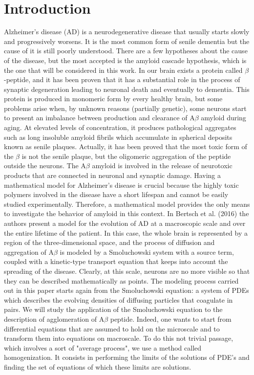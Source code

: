 \section{Introduction}
Alzheimer's disease (AD) is a neurodegenerative disease that usually starts slowly and progressively worsens. It is the most common form of senile dementia but the cause of it is still poorly understood. 
There are a few hypotheses about the cause of the disease, but the most accepted is the amyloid cascade hypothesis, which is the one that will be considered in this work.
In our brain exists a protein called \(\beta\)-peptide, and it has been proven that it has a substantial role in the process of synaptic degeneration leading to neuronal death and eventually to dementia. This protein is produced in monomeric form by every healthy brain, but some problems arise when,  by unknown reasons (partially genetic), some neurons start to present an imbalance between production and clearance of $\mathrm{A} \beta$ amyloid during aging. At elevated levels of concentration, it produces pathological aggregates such as long insoluble amyloid fibrils which accumulate in spherical deposits known as senile plaques. Actually, it has been proved that the most toxic form of the \(\beta\) is not the senile plaque, but the oligomeric aggregation of the peptide outside the neurons. The $\mathrm{A} \beta$ amyloid is involved in the release of neurotoxic products that are connected in neuronal and synaptic damage.
Having a mathematical model for Alzheimer's disease is crucial because the highly toxic polymers involved in the disease have a short lifespan and cannot be easily studied experimentally. Therefore, a mathematical model provides the only means to investigate the behavior of amyloid in this context.
In Bertsch et al. (2016) \cite{Bertsch} the authors present a model for the evolution of AD at a macroscopic scale and over the entire lifetime of the patient. In this case, the whole brain is represented by a region of the three-dimensional space, and the process of diffusion and aggregation of \(\mathrm{A}\beta\) is modeled by a Smoluchowski system with a source term, coupled with a kinetic-type transport equation that keeps into account the spreading of the disease. Clearly, at this scale, neurons are no more visible so that they can be described mathematically as points.
The modeling process carried out in this paper starts again from the Smoluchowski equation: a system of PDEs which describes the evolving densities of diffusing particles that coagulate in pairs. We will study the application of the Smoluchowski equation to the description of agglomeration of $\mathrm{A} \beta$ peptide. Indeed, one wants to start from differential equations that are assumed to hold on the microscale and to transform them into equations on macroscale. To do this not trivial passage, which involves a sort of "average process", we use a method called homogenization. It consists in performing the limits of the solutions of PDE's and finding the set of equations of which these limits are solutions. 

